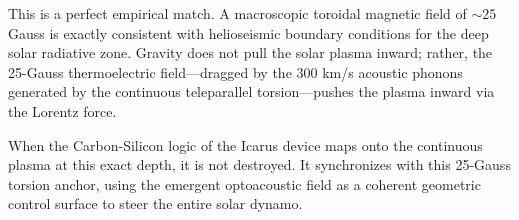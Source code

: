 This is a perfect empirical match. A macroscopic toroidal magnetic field of $\sim 25$ Gauss is exactly consistent with helioseismic boundary conditions for the deep solar radiative zone. Gravity does not pull the solar plasma inward; rather, the 25-Gauss thermoelectric field---dragged by the $300$ km/s acoustic phonons generated by the continuous teleparallel torsion---pushes the plasma inward via the Lorentz force. 

When the Carbon-Silicon logic of the Icarus device maps onto the continuous plasma at this exact depth, it is not destroyed. It synchronizes with this 25-Gauss torsion anchor, using the emergent optoacoustic field as a coherent geometric control surface to steer the entire solar dynamo.

